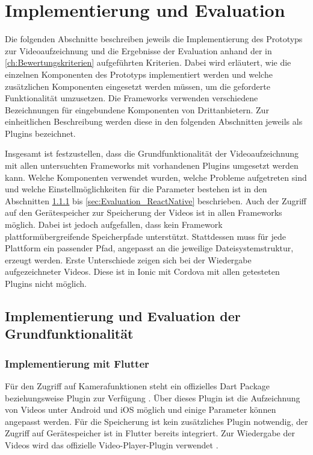 \chapter{Implementierung und Evaluation}
\label{ch:Evaluation}

Die folgenden Abschnitte beschreiben jeweils die Implementierung des Prototyps zur Videoaufzeichnung und die Ergebnisse der Evaluation anhand der in \autoref{ch:Bewertungskriterien} aufgeführten Kriterien.
Dabei wird erläutert, wie die einzelnen Komponenten des Prototyps implementiert werden und welche zusätzlichen Komponenten eingesetzt werden müssen, um die geforderte Funktionalität umzusetzen.
Die Frameworks verwenden verschiedene Bezeichnungen für eingebundene Komponenten von Drittanbietern.
Zur einheitlichen Beschreibung werden diese in den folgenden Abschnitten jeweils als Plugins bezeichnet. 

Insgesamt ist festzustellen, dass die Grundfunktionalität der Videoaufzeichnung mit allen untersuchten Frameworks mit vorhandenen Plugins umgesetzt werden kann.
Welche Komponenten verwendet wurden, welche Probleme aufgetreten sind und welche Einstellmöglichkeiten für die Parameter bestehen ist in den Abschnitten \ref{sec:Evaluation_Flutter} bis \ref{sec:Evaluation_ReactNative} beschrieben.
Auch der Zugriff auf den Gerätespeicher zur Speicherung der Videos ist in allen Frameworks möglich.
Dabei ist jedoch aufgefallen, dass kein Framework plattformübergreifende Speicherpfade unterstützt.
Stattdessen muss für jede Plattform ein passender Pfad, angepasst an die jeweilige Dateisystemstruktur, erzeugt werden.
Erste Unterschiede zeigen sich bei der Wiedergabe aufgezeichneter Videos.
Diese ist in Ionic mit Cordova mit allen getesteten Plugins nicht möglich.

\section{Implementierung und Evaluation der Grundfunktionalität}
\subsection{Implementierung mit Flutter}
\label{sec:Evaluation_Flutter}

Für den Zugriff auf Kamerafunktionen steht ein offizielles Dart Package beziehungsweise Plugin zur Verfügung \cite{Dart_Camera}.
Über dieses Plugin ist die Aufzeichnung von Videos unter Android und iOS möglich und einige Parameter können angepasst werden.
Für die Speicherung ist kein zusätzliches Plugin notwendig, der Zugriff auf Gerätespeicher ist in Flutter bereits integriert.
Zur Wiedergabe der Videos wird das offizielle Video-Player-Plugin verwendet \cite{Dart_Video}.

